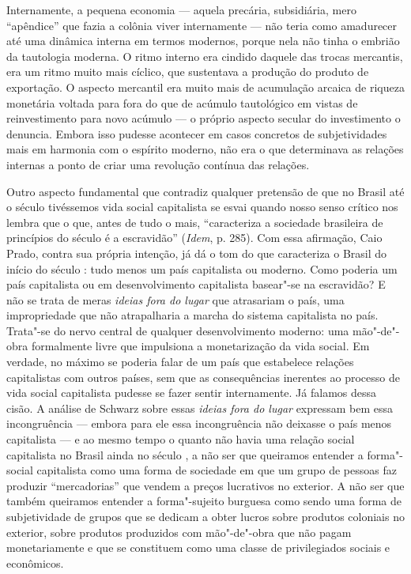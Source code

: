 Internamente, a pequena economia --- aquela precária, subsidiária, mero
``apêndice'' que fazia a colônia viver internamente --- não teria como
amadurecer até uma dinâmica interna em termos modernos, porque nela não
tinha o embrião da tautologia moderna. O ritmo interno era cindido
daquele das trocas mercantis, era um ritmo muito mais cíclico, que
sustentava a produção do produto de exportação. O aspecto mercantil era
muito mais de acumulação arcaica de riqueza monetária voltada para fora
do que de acúmulo tautológico em vistas de reinvestimento para novo
acúmulo --- o próprio aspecto secular do investimento o denuncia. Embora
isso pudesse acontecer em casos concretos de subjetividades mais em
harmonia com o espírito moderno, não era o que determinava as relações
internas a ponto de criar uma revolução contínua das relações.

Outro aspecto fundamental que contradiz qualquer pretensão de que no
Brasil até o século  tivéssemos vida social capitalista se esvai
quando nosso senso crítico nos lembra que o que, antes de tudo o mais,
``caracteriza a sociedade brasileira de princípios do século  é a
escravidão'' (\emph{Idem}, p. 285). Com essa afirmação, Caio Prado,
contra sua própria intenção, já dá o tom do que caracteriza o Brasil do
início do século : tudo menos um país capitalista ou moderno. Como
poderia um país capitalista ou em desenvolvimento capitalista basear"-se
na escravidão? E não se trata de meras \emph{ideias fora do lugar} que
atrasariam o país, uma impropriedade que não atrapalharia a marcha do
sistema capitalista no país. Trata"-se do nervo central de qualquer
desenvolvimento moderno: uma mão"-de"-obra formalmente livre que
impulsiona a monetarização da vida social. Em verdade, no máximo se
poderia falar de um país que estabelece relações capitalistas com outros
países, sem que as consequências inerentes ao processo de vida social
capitalista pudesse se fazer sentir internamente. Já falamos dessa
cisão. A análise de Schwarz sobre essas \emph{ideias fora do lugar}
expressam bem essa incongruência --- embora para ele essa incongruência
não deixasse o país menos capitalista --- e ao mesmo tempo o quanto não
havia uma relação social capitalista no Brasil ainda no século , a
não ser que queiramos entender a forma"-social capitalista como uma forma
de sociedade em que um grupo de pessoas faz produzir ``mercadorias'' que
vendem a preços lucrativos no exterior. A não ser que também queiramos
entender a forma"-sujeito burguesa como sendo uma forma de subjetividade
de grupos que se dedicam a obter lucros sobre produtos coloniais no
exterior, sobre produtos produzidos com mão"-de"-obra que não pagam
monetariamente e que se constituem como uma classe de privilegiados
sociais e econômicos.

